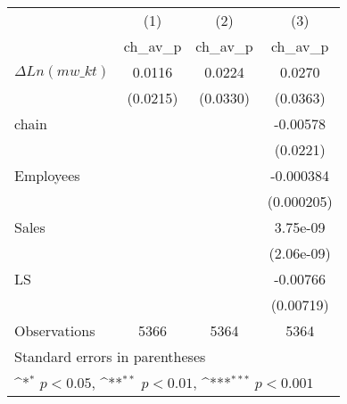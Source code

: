 {
\def\sym#1{\ifmmode^{#1}\else\(^{#1}\)\fi}
\begin{tabular}{l*{3}{c}}
\hline\hline
                    &\multicolumn{1}{c}{(1)}&\multicolumn{1}{c}{(2)}&\multicolumn{1}{c}{(3)}\\
                    &\multicolumn{1}{c}{ch\_av\_p}&\multicolumn{1}{c}{ch\_av\_p}&\multicolumn{1}{c}{ch\_av\_p}\\
\hline
$ \Delta Ln(mw\_{kt}) $&      0.0116         &      0.0224         &      0.0270         \\
                    &    (0.0215)         &    (0.0330)         &    (0.0363)         \\
[1em]
chain               &                     &                     &    -0.00578         \\
                    &                     &                     &    (0.0221)         \\
[1em]
Employees           &                     &                     &   -0.000384         \\
                    &                     &                     &  (0.000205)         \\
[1em]
Sales               &                     &                     &    3.75e-09         \\
                    &                     &                     &  (2.06e-09)         \\
[1em]
LS                  &                     &                     &    -0.00766         \\
                    &                     &                     &   (0.00719)         \\
\hline
Observations        &        5366         &        5364         &        5364         \\
\hline\hline
\multicolumn{4}{l}{\footnotesize Standard errors in parentheses}\\
\multicolumn{4}{l}{\footnotesize \sym{*} \(p<0.05\), \sym{**} \(p<0.01\), \sym{***} \(p<0.001\)}\\
\end{tabular}
}
